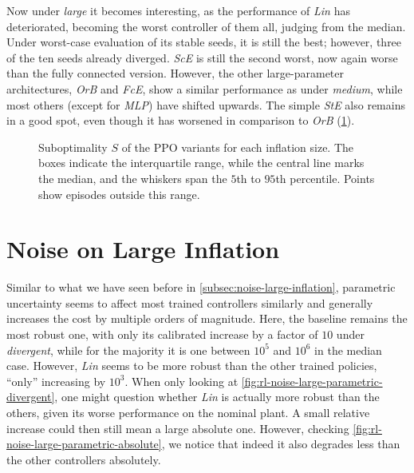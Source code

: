 Now under \emph{large} it becomes interesting, as the performance of \emph{Lin} has deteriorated, becoming the
worst controller of them all, judging from the median. Under worst-case evaluation of its stable seeds,
it is still the best; however, three of the ten seeds already diverged.
\emph{ScE} is still the second worst, now again worse than the fully connected version.
However, the other large-parameter architectures,
\emph{OrB} and \emph{FcE}, show a similar performance as under \emph{medium}, while most others
(except for \emph{MLP}) have shifted upwards. The simple \emph{StE} also remains in a good spot,
even though it has worsened in comparison to \emph{OrB} (\cref{fig:rl-across-sizes-subopt}).

\begin{figure}[htbp]
  \centering
  \caption[Suboptimality $S$ of the PPO variants for each inflation size.]{Suboptimality $S$ of the PPO variants for each inflation size. The boxes indicate the interquartile range, while
  the central line marks the median, and the whiskers span the $5$th to $95$th percentile. Points show episodes outside this range.}
  \label{fig:rl-across-sizes-subopt}
\end{figure}

\section{Noise on Large Inflation}
\label{sec:rl-noise-large}


Similar to what we have seen before in \cref{subsec:noise-large-inflation}, parametric uncertainty
seems to affect most trained controllers similarly and generally increases the cost by multiple orders
of magnitude. Here, the baseline remains the most robust one, with only its calibrated increase by a factor of $10$
under \emph{divergent}, while for the majority it is one between $10^5$ and $10^6$ in the median case. However,
\emph{Lin} seems to be more robust than the other trained policies, ``only'' increasing by $10^3$. When only looking
at \cref{fig:rl-noise-large-parametric-divergent}, one might question whether \emph{Lin} is actually
more robust than the others, given its worse performance on the nominal plant. A small relative increase could
then still mean a large absolute one. However, checking \cref{fig:rl-noise-large-parametric-absolute},
we notice that indeed it also degrades less than the other controllers absolutely.

